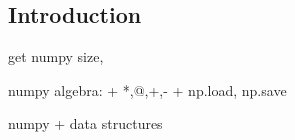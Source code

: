 
\subsection{Introduction}

get numpy size, 


numpy algebra:
+ *,@,+,-
+ np.load, np.save

numpy
+ data structures
